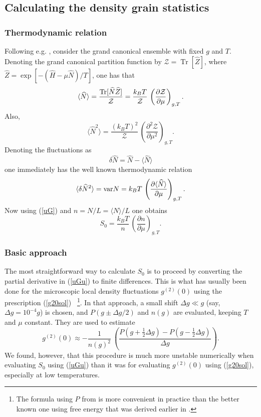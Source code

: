 \documentclass[aps,twocolumn,pra,superscriptaddress,nofootinbib,amsmath,amssymb,floats,floatfix,english]{revtex4-1}
\newcommand{\op}[1]{\widehat{#1}}
\newcommand{\mc}[1]{{\mathcal{#1}}}
\DeclareMathOperator{\TR}{Tr}
\newcommand{\eqn}[1]{(\ref{#1})}
\renewcommand{\eq}[2]{\begin{equation}\label{#1}#2\end{equation}}
\begin{document}
\subsection{Calculating the density grain statistics}
\label{UGCALC}

\subsubsection{Thermodynamic relation}
Following e.g. \cite{Armijo10}, consider the grand canonical ensemble with fixed $g$ and $T$.
Denoting the grand canonical partition function by $\mc{Z} = \TR[\op{Z}]$, where $\op{Z}=\exp\left[-\left(\op{H} - \mu \op{N}\right)/T\right]$, 
one has that 
\eq{wbNZ}{
\langle \op{N} \rangle = \frac{{\rm Tr}[\op{N}\op{Z}]}{\mc{Z}} = \frac{k_BT}{\mc{Z}}\,\left(\frac{\partial\mc{Z}}{\partial\mu}\right)_{g,T}.
}
Also,
\eq{wbN2Z}{
\langle \op{N}^2 \rangle = \frac{(k_BT)^2}{\mc{Z}}\,\left(\frac{\partial^2\mc{Z}}{\partial\mu^2}\right)_{g,T}.
}
Denoting the fluctuations as 
\eq{delN}{
\delta\op{N} = \op{N} - \langle\op{N}\rangle
}
one immediately has the well known thermodynamic relation
\eq{wbN2mu}{
\langle\delta \op{N}^2\rangle = {\rm var}N = k_BT\,\left(\frac{\partial\langle\op{N}\rangle}{\partial\mu}\right)_{g,T}.
}
Now using \eqn{uG} and $n=N/L=\langle N\rangle/L$ one obtains
\eq{uGu}{
S_0 = \frac{k_BT}{n}\,\left(\frac{\partial n}{\partial\mu}\right)_{g,T}.
}

\subsubsection{Basic approach}
The most straightforward way to calculate $S_0$  is to proceed by converting the partial derivative in \eqn{uGu} to finite differences. This is  what has usually been done for the microscopic local density fluctuations $g^{(2)}(0)$ using the prescription \eqn{g20sol} \ \cite{Kheruntsyan05}\footnote{The formula using $P$ from \cite{Kheruntsyan05} is more convenient in practice than the better known one using free energy that was derived earlier in \cite{Kheruntsyan03}.}. 
In that approach,  a small shift $\Delta g \ll g$ (say, $\Delta g=10^{-4}g$) is chosen, and  $P(g\pm\Delta g/2)$ and $n(g)$ are evaluated, keeping $T$ and $\mu$ constant.
They are used to estimate
\eq{g20est}{
g^{(2)}(0) \approx -\frac{1}{n(g)^2}\ \left(\frac{P(g+\tfrac{1}{2}\Delta g)-P(g-\tfrac{1}{2}\Delta g)}{\Delta g}\right).
}
We found, however, that this procedure is much more unstable numerically when evaluating $S_0$ using 
\eqn{uGu} than it was for evaluating $g^{(2)}(0)$ using \eqn{g20sol}, especially at low temperatures. 
\end{document}
